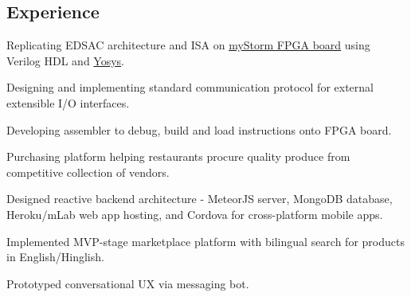 \documentclass[]{deedy}
\begin{document}
\begin{minipage}[t]{0.69\textwidth}
\begin{flushleft}
\section{Experience}
%
\vspace{1.1pt}
\begin{tightemize}
\item Replicating EDSAC architecture and ISA on \href{https://mystorm.uk/}{myStorm FPGA board} using Verilog HDL and \href{http://www.clifford.at/yosys/}{Yosys}.
\item Designing and implementing standard communication protocol for external extensible I/O interfaces.
\item Developing assembler to debug, build and load instructions onto FPGA board.
\end{tightemize}
\sectionsep
%
\vspace{1.1pt}
\begin{tightemize}
\item Purchasing platform helping restaurants procure quality produce from competitive collection of vendors.
\item Designed reactive backend architecture - MeteorJS server, MongoDB database, Heroku/mLab web app hosting, and Cordova for cross-platform mobile apps.
\item Implemented MVP-stage marketplace platform with bilingual search for products in English/Hinglish.
\item Prototyped conversational UX via messaging bot.
\end{tightemize}
\sectionsep
%

\end{flushleft}
\end{minipage}
\end{document}
